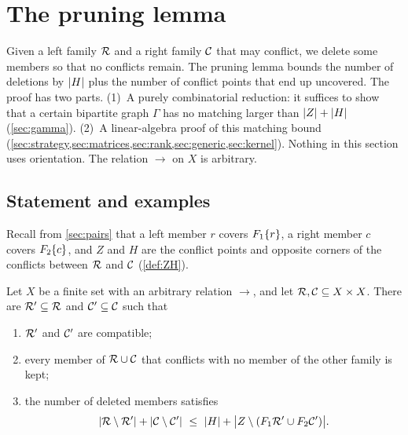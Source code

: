 \section{The pruning lemma}\label{sec:pruning}

\begin{idea}
Given a left family $\mathcal R$ and a right family $\mathcal C$ that may conflict, we
delete some members so that no conflicts remain. The pruning lemma bounds
the number of deletions by $\lvert H\rvert$ plus the number of conflict points that
end up uncovered. The proof has two parts.
(1)~A purely combinatorial reduction: it suffices to show that a certain
bipartite graph $\Gamma$ has no matching larger than $\lvert Z\rvert+\lvert H\rvert$
(\cref{sec:gamma}).
(2)~A linear-algebra proof of this matching bound
(\cref{sec:strategy,sec:matrices,sec:rank,sec:generic,sec:kernel}).
Nothing in this section uses orientation. The relation $\to$ on $X$ is
arbitrary.
\end{idea}

\subsection{Statement and examples}

Recall from \cref{sec:pairs} that a left member $r$ covers $F_1\{r\}$, a right
member $c$ covers $F_2\{c\}$, and $Z$ and $H$ are the conflict points and
opposite corners of the conflicts between $\mathcal R$ and $\mathcal C$
(\cref{def:ZH}).

\begin{lemma}\label{lem:pruning}
Let $X$ be a finite set with an arbitrary relation $\to$, and let
$\mathcal R,\mathcal C\subseteq X\times X$. There are $\mathcal R'\subseteq\mathcal R$ and $\mathcal C'\subseteq\mathcal C$ such that
\begin{enumerate}[label=\textup{(P\arabic*)}]
\item\label{P1} $\mathcal R'$ and $\mathcal C'$ are compatible;
\item\label{P2} every member of $\mathcal R\cup\mathcal C$ that conflicts with no member of the
other family is kept;
\item\label{P3} the number of deleted members satisfies
\begin{equation}\label{eq:pruning-bound}
 \lvert \mathcal R\setminus\mathcal R'\rvert+\lvert \mathcal C\setminus\mathcal C'\rvert\ \le\ \lvert H\rvert+\bigl\lvert Z\setminus(F_1\mathcal R'\cup F_2\mathcal C')\bigr\rvert .
\end{equation}
\end{enumerate}
\end{lemma}

